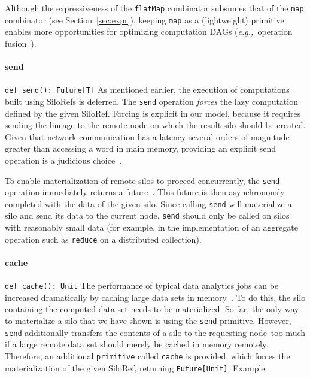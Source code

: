 \documentclass[preprint]{sigplanconf}
\theoremstyle{definition}
\theoremstyle{definition}
\newcommand{\eg}{{\em e.g.,~}}
\begin{document}
Although the expressiveness of the \verb|flatMap| combinator subsumes that of
the \verb|map| combinator (see Section~\ref{sec:expr}), keeping \verb|map| as
a (lightweight) primitive enables more opportunities for optimizing
computation DAGs (\eg operation fusion~\cite{FlumeJava}).

\paragraph{send} \texttt{def send(): Future[T]}
\newline As mentioned earlier, the execution of computations built using
SiloRefs is deferred. The \verb|send| operation {\em forces} the lazy
computation defined by the given SiloRef. Forcing is explicit in our model,
because it requires sending the lineage to the remote node on which the result
silo should be created. Given that network communication has a latency several
orders of magnitude greater than accessing a word in main memory, providing an
explicit send operation is a judicious choice~\cite{ANoteDistComp}.

To enable materialization of remote silos to proceed concurrently, the
\verb|send| operation immediately returns a future~\cite{Futures}. This future
is then asynchronously completed with the data of the given silo. Since
calling \verb|send| will materialize a silo and send its data to the current
node, \verb|send| should only be called on silos with reasonably small data
(for example, in the implementation of an aggregate operation such as
\verb|reduce| on a distributed collection).

\paragraph{cache} \texttt{def cache(): Unit}
\newline The performance of typical data analytics jobs can be increased
dramatically by caching large data sets in memory~\cite{Spark}. To do this, the
silo containing the computed data set needs to be materialized. So far, the
only way to materialize a silo that we have shown is using the \verb|send|
primitive. However, \verb|send| additionally transfers the contents of a silo
to the requesting node--too much if a large remote data set should merely be
cached in memory remotely. Therefore, an additional \verb|primitive| called
\verb|cache| is provided, which forces the materialization of the given SiloRef,
returning \verb|Future[Unit]|. Example:
\end{document}
